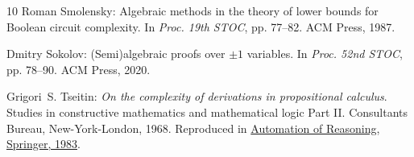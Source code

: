 \documentclass[11pt]{article}
\begin{document}
\begin{thebibliography}{10}
{\sc Roman Smolensky}: Algebraic methods in the theory of lower bounds for
  {Boolean} circuit complexity.
\newblock In {\em Proc. 19th STOC}, pp. 77--82. ACM Press, 1987.
\newblock [\epfmtdoi{10.1145/28395.28404}]

{\sc Dmitry Sokolov}: ({S}emi)algebraic proofs over $\pm 1$ variables.
\newblock In {\em Proc. 52nd STOC}, pp. 78--90. ACM Press, 2020.
\newblock [\epfmtdoi{10.1145/3357713.3384288}]

{\sc Grigori~S. Tseitin}: {\em On the complexity of derivations in
  propositional calculus}.
\newblock Studies in constructive mathematics and mathematical logic Part II.
  Consultants Bureau, New-York-London, 1968.
\newblock Reproduced in
  \href{https://doi.org/10.1007/978-3-642-81955-1\_28}{Automation of Reasoning,
  Springer, 1983}.

\end{thebibliography}
\end{document}
